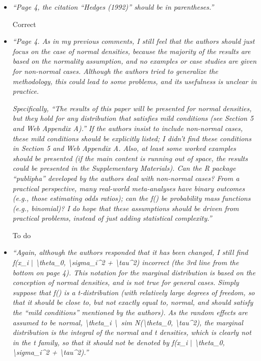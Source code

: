 \documentclass[11pt]{article}
\begin{document}
\begin{itemize}
\item \emph{``Page 4, the citation “Hedges (1992)” should be in parentheses.''}

Correct\\

\item \emph{``Page 4. As in my previous comments, I still feel that the authors should just focus on the case of normal densities, because the majority of the results are based on the normality assumption, and no examples or case studies are given for non-normal cases. Although the authors tried to generalize the methodology, this could lead to some problems, and its usefulness is unclear in practice.}

\emph{Specifically, ``The results of this paper will be presented for normal densities, but they hold for any distribution that satisfies mild conditions (see Section 5 and Web Appendix A).'' If the authors insist to include non-normal cases, these mild conditions should be explicitly listed; I didn't find these conditions in Section 5 and Web Appendix A. Also, at least some worked examples should be presented (if the main content is running out of space, the results could be presented in the Supplementary Materials). Can the R package ``publipha'' developed by the authors deal with non-normal cases? From a practical perspective, many real-world meta-analyses have binary outcomes (e.g., those estimating odds ratios); can the f() be probability mass functions (e.g., binomial)? I do hope that these assumptions should be driven from practical problems, instead of just adding statistical complexity.''}

To do\\

\item \emph{``Again, although the authors responded that it has been changed, I still find f(x\_i $\mid$ \textbackslash theta\_0, \textbackslash sigma\_i\^{}2 + \textbackslash tau\^{}2) incorrect (the 3rd line from the bottom on page 4). This notation for the marginal distribution is based on the conception of normal densities, and is not true for general cases. Simply suppose that f() is a t-distribution (with relatively large degrees of freedom, so that it should be close to, but not exactly equal to, normal, and should satisfy the “mild conditions” mentioned by the authors). As the random effects are assumed to be normal, \textbackslash theta\_i \textbackslash\ sim N(\textbackslash theta\_0, \textbackslash tau\^{}2), the marginal distribution is the integral of the normal and t densities, which is clearly not in the t family, so that it should not be denoted by f(x\_i $\mid$ \textbackslash theta\_0, \textbackslash sigma\_i\^{}2 + \textbackslash tau\^{}2).''}


\end{itemize}
\end{document}
